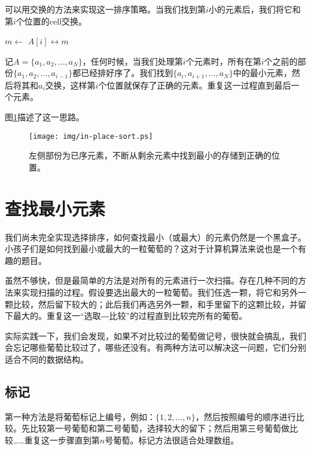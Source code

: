 \documentclass[UTF8]{article}
\begin{document}
可以用交换的方法来实现这一排序策略。当我们找到第$i$小的元素后，我们将它和第$i$个位置的cell交换。

\begin{algorithmic}
    \State $m \gets$ 
    \State {} $A[i] \leftrightarrow m$
  \EndFor
\EndFunction
\end{algorithmic}

记$A = \{a_1, a_2, ..., a_N\}$，任何时候，当我们处理第$i$个元素时，所有在第$i$个之前的部份$\{a_1, a_2, ..., a_{i-1}\}$都已经排好序了。我们找到$\{a_i, a_{i+1}, ..., a_N\}$中的最小元素，然后将其和$a_i$交换，这样第$i$个位置就保存了正确的元素。重复这一过程直到最后一个元素。

图\ref{fig:in-place-sort}描述了这一思路。

\begin{figure}[htbp]
  \centering
  \texttt{[image: img/in-place-sort.ps]}
  \caption{左侧部份为已序元素，不断从剩余元素中找到最小的存储到正确的位置。}
  \label{fig:in-place-sort}
\end{figure}

\section{查找最小元素}

我们尚未完全实现选择排序，如何查找最小（或最大）的元素仍然是一个黑盒子。小孩子们是如何找到最小或最大的一粒葡萄的？这对于计算机算法来说也是一个有趣的题目。

虽然不够快，但是最简单的方法是对所有的元素进行一次扫描。存在几种不同的方法来实现扫描的过程。假设要选出最大的一粒葡萄。我们任选一颗，将它和另外一颗比较，然后留下较大的；此后我们再选另外一颗，和手里留下的这颗比较，并留下最大的。重复这一“选取―比较”的过程直到比较完所有的葡萄。

实际实践一下，我们会发现，如果不对比较过的葡萄做记号，很快就会搞乱，我们会忘记哪些葡萄比较过了，哪些还没有。有两种方法可以解决这一问题，它们分别适合不同的数据结构。

\subsection{标记}
第一种方法是将葡萄标记上编号，例如：$\{1, 2, ..., n\}$，然后按照编号的顺序进行比较。先比较第一号葡萄和第二号葡萄，选择较大的留下；然后用第三号葡萄做比较……重复这一步骤直到第$n$号葡萄。标记方法很适合处理数组。
\end{document}
